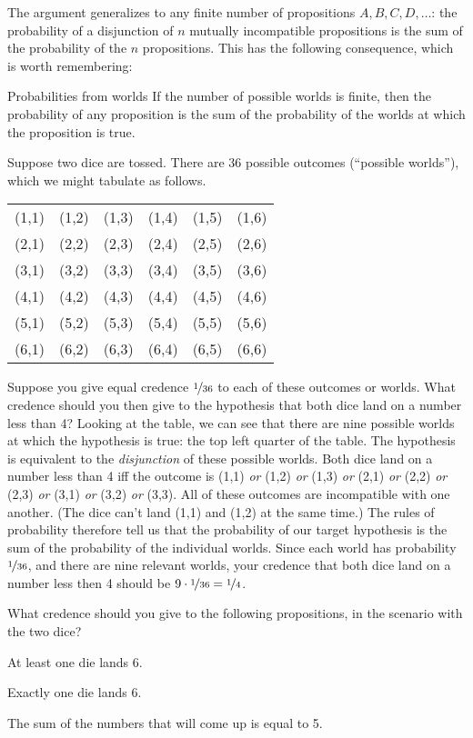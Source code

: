 The argument generalizes to any finite number of propositions
$A,B,C,D,\ldots$: the probability of a disjunction of $n$ mutually
incompatible propositions is the sum of the probability of the $n$
propositions. This has the following consequence, which is worth
remembering:

\begin{genericthm}{Probabilities from worlds}
  If the number of possible worlds is finite, then the probability of
  any proposition is the sum of the probability of the worlds at which
  the proposition is true.
\end{genericthm}

Suppose two dice are tossed. There are 36 possible
outcomes (``possible worlds''), which we might tabulate as follows.
%
\begin{center}
\begin{tabular}{cccccc}
  (1,1) & (1,2) & (1,3) & (1,4) & (1,5) & (1,6)\\
  (2,1) & (2,2) & (2,3) & (2,4) & (2,5) & (2,6)\\
  (3,1) & (3,2) & (3,3) & (3,4) & (3,5) & (3,6)\\
  (4,1) & (4,2) & (4,3) & (4,4) & (4,5) & (4,6)\\
  (5,1) & (5,2) & (5,3) & (5,4) & (5,5) & (5,6)\\
  (6,1) & (6,2) & (6,3) & (6,4) & (6,5) & (6,6)
\end{tabular}
\end{center}
%
Suppose you give equal credence $\nicefrac{1}{36}$ to each of these outcomes or
worlds. What credence should you then give to the hypothesis that both dice land
on a number less than 4? Looking at the table, we can see that there are nine
possible worlds at which the hypothesis is true: the top left quarter of the
table. The hypothesis is equivalent to the \emph{disjunction} of these possible
worlds. Both dice land on a number less than 4 iff the outcome is (1,1)
\emph{or} (1,2) \emph{or} (1,3) \emph{or} (2,1) \emph{or} (2,2) \emph{or} (2,3)
\emph{or} (3,1) \emph{or} (3,2) \emph{or} (3,3). All of these outcomes are
incompatible with one another. (The dice can't land (1,1) and (1,2) at the same
time.) The rules of probability therefore tell us that the probability of our
target hypothesis is the sum of the probability of the individual worlds. Since
each world has probability $\nicefrac{1}{36}$, and there are nine relevant worlds,
your credence that both dice land on a number less then 4 should be
$9 \cdot \nicefrac{1}{36} = \nicefrac{1}{4}$.
\begin{exercise}{1}
  What credence should you give to the following propositions, in the
  scenario with the two dice?
  \begin{exlist}
  \item At least one die lands 6.
  \item Exactly one die lands 6.
  \item The sum of the numbers that will come up is equal to 5.
  \end{exlist}
\end{exercise}

